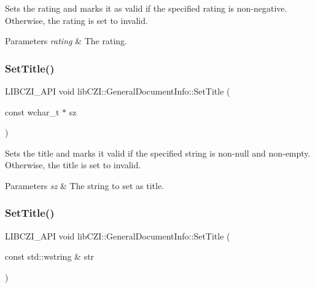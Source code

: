 Sets the rating and marks it as valid if the specified rating is non-\/negative. Otherwise, the rating is set to invalid. 
\begin{DoxyParams}{Parameters}
{\em rating} & The rating. \\
\hline
\end{DoxyParams}
\mbox{\label{structlib_c_z_i_1_1_general_document_info_a1ea606405f5b43102642a715eec17b53}} 
\subsubsection{\texorpdfstring{Set\+Title()}{SetTitle()}\hspace{0.1cm}{\footnotesize\ttfamily [1/2]}}
{\footnotesize\ttfamily L\+I\+B\+C\+Z\+I\+\_\+\+A\+PI void lib\+C\+Z\+I\+::\+General\+Document\+Info\+::\+Set\+Title (\begin{DoxyParamCaption}\item[{const wchar\+\_\+t $\ast$}]{sz }\end{DoxyParamCaption})\hspace{0.3cm}{\ttfamily [inline]}}

Sets the title and marks it valid if the specified string is non-\/null and non-\/empty. Otherwise, the title is set to invalid.


\begin{DoxyParams}{Parameters}
{\em sz} & The string to set as title. \\
\hline
\end{DoxyParams}
\mbox{\label{structlib_c_z_i_1_1_general_document_info_a860b74a7e96da05ed2cd6cf74bf7b2c1}} 
\subsubsection{\texorpdfstring{Set\+Title()}{SetTitle()}\hspace{0.1cm}{\footnotesize\ttfamily [2/2]}}
{\footnotesize\ttfamily L\+I\+B\+C\+Z\+I\+\_\+\+A\+PI void lib\+C\+Z\+I\+::\+General\+Document\+Info\+::\+Set\+Title (\begin{DoxyParamCaption}\item[{const std\+::wstring \&}]{str }\end{DoxyParamCaption})\hspace{0.3cm}{\ttfamily [inline]}}

